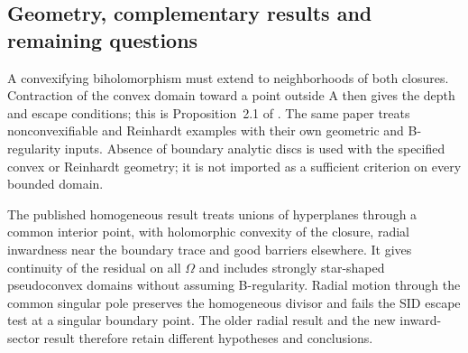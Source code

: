 \subsection{Geometry, complementary results and remaining questions}
\label{sec:appH-boundary-Green-directions}

A convexifying biholomorphism must extend to neighborhoods of both
closures. Contraction of the convex domain toward a point outside A
then gives the depth and escape conditions; this is Proposition~2.1
of \cite[actual~11]{DaoNguyenTran26HypersurfaceGreenV1}.
The same paper treats nonconvexifiable and Reinhardt examples with
their own geometric and B-regularity inputs. Absence of boundary
analytic discs is used with the specified convex or Reinhardt geometry;
it is not imported as a sufficient criterion on every bounded domain.

The published homogeneous result
\cite[Theorem~2.2 and Corollary~2.9, printed~184--185 and~192]{Nguyen05HypersurfaceGreenPublished}
treats unions of hyperplanes through a common interior point, with
holomorphic convexity of the closure, radial inwardness near the
boundary trace and good barriers elsewhere. It gives continuity
of the residual on all \(\Omega\) and includes strongly star-shaped
pseudoconvex domains without assuming B-regularity. Radial motion
through the common singular pole preserves the homogeneous divisor
and fails the SID escape test at a singular boundary point.
The older radial result and the new inward-sector result therefore
retain different hypotheses and conclusions.

